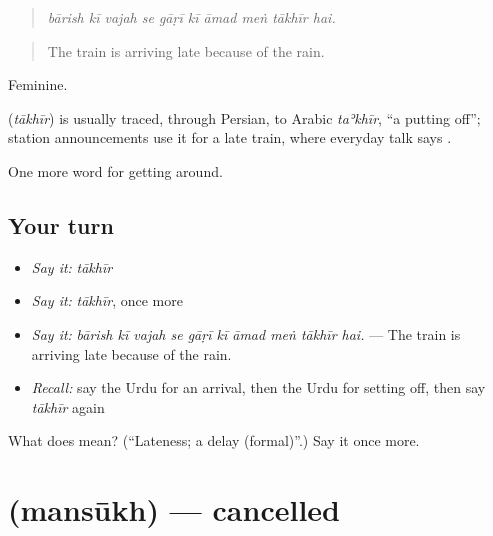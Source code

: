 \begin{quote}
         
\end{quote}

\begin{quote}
\emph{bārish kī vajah se gāṛī kī āmad meṅ tākhīr hai.}
\end{quote}

\begin{quote}
The train is arriving late because of the rain.
\end{quote}

Feminine.

\begin{cousinweb}
\textbf{} (\emph{tākhīr}) is usually traced, through Persian, to Arabic \emph{taʾkhīr}, \textquotedblleft{}a putting off\textquotedblright{}; station announcements use it for a late train, where everyday talk says \textbf{}.
\end{cousinweb}

\begin{grammarlens}[title={What you've built}]
One more word for getting around.
\end{grammarlens}

\subsection*{Your turn}
\begin{itemize}
\raggedright
  \item \emph{Say it:} \emph{tākhīr}
  \item \emph{Say it:} \emph{tākhīr}, once more
  \item \emph{Say it:} \emph{bārish kī vajah se gāṛī kī āmad meṅ tākhīr hai.} — The train is arriving late because of the rain.
  \item \emph{Recall:} say the Urdu for an arrival, then the Urdu for setting off, then say \emph{tākhīr} again
\end{itemize}

\begin{tcolorbox}[breakable,colback=teal!4,colframe=teal!35!black,title={Before you move on}]
What does  mean? (\textquotedblleft{}Lateness; a delay (formal)\textquotedblright{}.) Say it once more.
\end{tcolorbox}
\section[\texorpdfstring{\ur{منسوخ} (mansūkh)}{منسوخ (mansūkh)}]{ (mansūkh) — cancelled}

